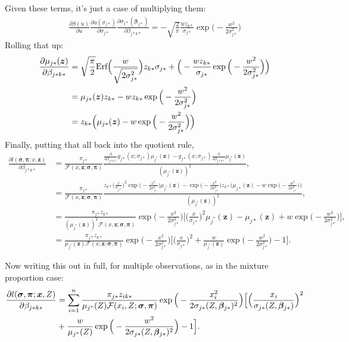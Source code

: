 Given these terms, it's just a case of multiplying them:
\begin{align*}
\frac{\partial S(u)}{\partial u} \frac{\partial u(\sigma_{j*})}{\partial \sigma_{j*} } \frac{\partial \sigma_{j*}(\bm{\beta}_{j*})}{\partial \beta_{j*k*}} = - \sqrt{\frac{2}{\pi}} \frac{w z_{k*}}{\sigma_{j*}} \exp\Big( -\frac{w^2}{2\sigma_{j*}^2} \Big)
\end{align*}
Rolling that up:
\begin{align*}
\frac{\partial \mu_{j*}(\bm{z})}{\partial \beta_{j*k*}} &= \sqrt{\frac{\pi}{2}} \text{Erf}\Big(\frac{w}{\sqrt{2\sigma_{j*}^2}}\Big) z_{k*} \sigma_{j*}  +  \Big( - \frac{w z_{k*} }{\sigma_{j*}} \exp\Big( -\frac{w^2}{2\sigma_{j*}^2} \Big) \Big)\\
&= \mu_{j*}(\bm{z}) z_{k*} - w z_{k*} \exp\Big( -\frac{w^2}{2\sigma_{j*}^2} \Big)\\
&= z_{k*} \Big(\mu_{j*}(\bm{z}) - w \exp\Big( -\frac{w^2}{2\sigma_{j*}^2} \Big)\Big)
\end{align*}
Finally, putting that all back into the quotient rule,
\begin{align*}
\frac{\partial l(\bm{\sigma},\bm{\pi}; x, \bm{z})}{\partial \beta_{j*k*}} &= \frac{\pi_{j*}}{\mathcal{F}(x,\bm{z};\bm{\sigma},\bm{\pi})} \frac{\frac{\partial}{\partial \beta_{j*k*}} g_{j*}(x;\sigma_{j*}) \mu_{j^*}(\bm{z}) - g_{j*}(x;\sigma_{j*})\frac{\partial}{\partial \beta_{j*k*}} \mu_{j^*}(\bm{z})}{(\mu_{j^*}(\bm{z}))^2},\\
&= \frac{\pi_{j*}}{\mathcal{F}(x,\bm{z};\bm{\sigma},\bm{\pi})} \frac{ z_{k*} \Big( \frac{x}{\sigma_{j*}}\Big)^2 \exp \Big(-\frac{x^2}{2 \sigma_{j*}^2}\Big)  \mu_{j^*}(\bm{z}) - \exp \Big(-\frac{x^2}{2 \sigma_{j*}^2}\Big) z_{k*} \Big(\mu_{j*}(\bm{z}) - w \exp\Big( -\frac{w^2}{2\sigma_{j*}^2} \Big)\Big) }{(\mu_{j^*}(\bm{z}))^2},\\
&= \frac{\pi_{j*} z_{k*}}{(\mu_{j^*}(\bm{z}))^2\mathcal{F}(x,\bm{z};\bm{\sigma},\bm{\pi})} \exp \Big(-\frac{x^2}{2 \sigma_{j*}^2}\Big) \Big[\Big( \frac{x}{\sigma_{j*}}\Big)^2 \mu_{j^*}(\bm{z}) - \mu_{j*}(\bm{z}) + w \exp\Big( -\frac{w^2}{2\sigma_{j*}^2}\Big)\Big],\\
&= \frac{\pi_{j*} z_{k*}}{\mu_{j^*}(\bm{z})\mathcal{F}(x,\bm{z};\bm{\sigma},\bm{\pi})} \exp \Big(-\frac{x^2}{2 \sigma_{j*}^2}\Big) \Big[\Big( \frac{x}{\sigma_{j*}}\Big)^2  + \frac{w}{\mu_{j^*}(\bm{z})} \exp\Big( -\frac{w^2}{2\sigma_{j*}^2}\Big) -1\Big].
\end{align*}

Now writing this out in full, for multiple observations, as in the mixture proportion case:
\begin{align*}
\frac{\partial l(\bm{\sigma},\bm{\pi}; \bm{x}, Z)}{\partial \beta_{j*k*}} &= \sum_{i=1}^n \frac{\pi_{j*} z_{ik*}}{\mu_{j^*}(Z)\mathcal{F}(x_i,Z;\bm{\sigma},\bm{\pi})} \exp \Big(-\frac{x_i^2}{2 \sigma_{j*}(Z,\bm{\beta}_{j*})^2}\Big) \Big[\Big( \frac{x_i}{\sigma_{j*}(Z,\bm{\beta_}{j*})}\Big)^2\\
&  + \frac{w}{\mu_{j^*}(Z)} \exp\Big( -\frac{w^2}{2\sigma_{j*}(Z,\bm{\beta}_{j*})^2}\Big) -1\Big].
\end{align*}

